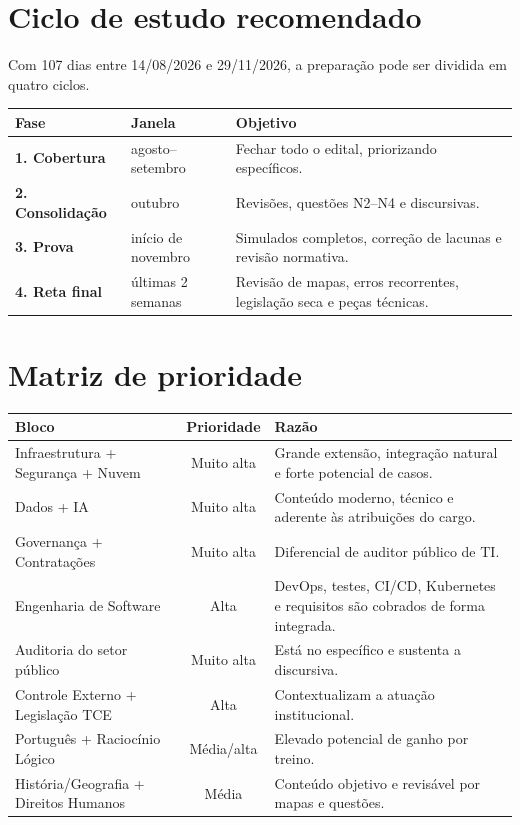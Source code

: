 \section{Ciclo de estudo recomendado}

Com 107 dias entre 14/08/2026 e 29/11/2026, a preparação pode ser dividida em quatro ciclos.

\begin{table}[ht]
\centering
\begin{tabularx}{\textwidth}{>{\bfseries}l l X}
\toprule
Fase & Janela & Objetivo \\
\midrule
1. Cobertura & agosto--setembro & Fechar todo o edital, priorizando específicos. \\
2. Consolidação & outubro & Revisões, questões N2--N4 e discursivas. \\
3. Prova & início de novembro & Simulados completos, correção de lacunas e revisão normativa. \\
4. Reta final & últimas 2 semanas & Revisão de mapas, erros recorrentes, legislação seca e peças técnicas. \\
\bottomrule
\end{tabularx}
\end{table}

\section{Matriz de prioridade}

\begin{table}[ht]
\centering
\small
\begin{tabularx}{\textwidth}{l c X}
\toprule
Bloco & Prioridade & Razão \\
\midrule
Infraestrutura + Segurança + Nuvem & Muito alta & Grande extensão, integração natural e forte potencial de casos. \\
Dados + IA & Muito alta & Conteúdo moderno, técnico e aderente às atribuições do cargo. \\
Governança + Contratações & Muito alta & Diferencial de auditor público de TI. \\
Engenharia de Software & Alta & DevOps, testes, CI/CD, Kubernetes e requisitos são cobrados de forma integrada. \\
Auditoria do setor público & Muito alta & Está no específico e sustenta a discursiva. \\
Controle Externo + Legislação TCE & Alta & Contextualizam a atuação institucional. \\
Português + Raciocínio Lógico & Média/alta & Elevado potencial de ganho por treino. \\
História/Geografia + Direitos Humanos & Média & Conteúdo objetivo e revisável por mapas e questões. \\
\bottomrule
\end{tabularx}
\end{table}

